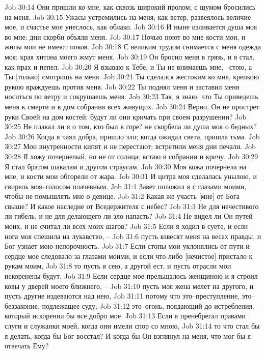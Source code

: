 Job 30:14  Они пришли ко мне, как сквозь широкий пролом; с шумом бросились на меня.
Job 30:15  Ужасы устремились на меня; как ветер, развеялось величие мое, и счастье мое унеслось, как облако.
Job 30:16  И ныне изливается душа моя во мне: дни скорби объяли меня.
Job 30:17  Ночью ноют во мне кости мои, и жилы мои не имеют покоя.
Job 30:18  С великим трудом снимается с меня одежда моя; края хитона моего жмут меня.
Job 30:19  Он бросил меня в грязь, и я стал, как прах и пепел.
Job 30:20  Я взываю к Тебе, и Ты не внимаешь мне, --стою, а Ты [только] смотришь на меня.
Job 30:21  Ты сделался жестоким ко мне, крепкою рукою враждуешь против меня.
Job 30:22  Ты поднял меня и заставил меня носиться по ветру и сокрушаешь меня.
Job 30:23  Так, я знаю, что Ты приведешь меня к смерти и в дом собрания всех живущих.
Job 30:24  Верно, Он не прострет руки Своей на дом костей: будут ли они кричать при своем разрушении?
Job 30:25  Не плакал ли я о том, кто был в горе? не скорбела ли душа моя о бедных?
Job 30:26  Когда я чаял добра, пришло зло; когда ожидал света, пришла тьма.
Job 30:27  Мои внутренности кипят и не перестают; встретили меня дни печали.
Job 30:28  Я хожу почернелый, но не от солнца; встаю в собрании и кричу.
Job 30:29  Я стал братом шакалам и другом страусам.
Job 30:30  Моя кожа почернела на мне, и кости мои обгорели от жара.
Job 30:31  И цитра моя сделалась унылою, и свирель моя--голосом плачевным.
Job 31:1  Завет положил я с глазами моими, чтобы не помышлять мне о девице.
Job 31:2  Какая же участь [мне] от Бога свыше? И какое наследие от Вседержителя с небес?
Job 31:3  Не для нечестивого ли гибель, и не для делающего ли зло напасть?
Job 31:4  Не видел ли Он путей моих, и не считал ли всех моих шагов?
Job 31:5  Если я ходил в суете, и если нога моя спешила на лукавство, --
Job 31:6  пусть взвесят меня на весах правды, и Бог узнает мою непорочность.
Job 31:7  Если стопы мои уклонялись от пути и сердце мое следовало за глазами моими, и если что-либо [нечистое] пристало к рукам моим,
Job 31:8  то пусть я сею, а другой ест, и пусть отрасли мои искоренены будут.
Job 31:9  Если сердце мое прельщалось женщиною и я строил ковы у дверей моего ближнего, --
Job 31:10  пусть моя жена мелет на другого, и пусть другие издеваются над нею,
Job 31:11  потому что это--преступление, это--беззаконие, подлежащее суду;
Job 31:12  это--огонь, поядающий до истребления, который искоренил бы все добро мое.
Job 31:13  Если я пренебрегал правами слуги и служанки моей, когда они имели спор со мною,
Job 31:14  то что стал бы я делать, когда бы Бог восстал? И когда бы Он взглянул на меня, что мог бы я отвечать Ему?
